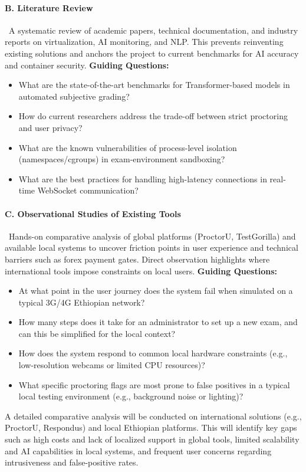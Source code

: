 \paragraph*{B. Literature Review}\
A systematic review of academic papers, technical documentation, and industry reports on virtualization, AI monitoring, and NLP. This prevents reinventing existing solutions and anchors the project to current benchmarks for AI accuracy and container security.
\textbf{Guiding Questions:}
\begin{itemize}
    \item What are the state-of-the-art benchmarks for Transformer-based models in automated subjective grading?
    \item How do current researchers address the trade-off between strict proctoring and user privacy?
    \item What are the known vulnerabilities of process-level isolation (namespaces/cgroups) in exam-environment sandboxing?
    \item What are the best practices for handling high-latency connections in real-time WebSocket communication?
\end{itemize}

\paragraph*{C. Observational Studies of Existing Tools}\
Hands-on comparative analysis of global platforms (ProctorU, TestGorilla) and available local systems to uncover friction points in user experience and technical barriers such as forex payment gates. Direct observation highlights where international tools impose constraints on local users.
\textbf{Guiding Questions:}
\begin{itemize}
    \item At what point in the user journey does the system fail when simulated on a typical 3G/4G Ethiopian network?
    \item How many steps does it take for an administrator to set up a new exam, and can this be simplified for the local context?
    \item How does the system respond to common local hardware constraints (e.g., low-resolution webcams or limited CPU resources)?
    \item What specific proctoring flags are most prone to false positives in a typical local testing environment (e.g., background noise or lighting)?
\end{itemize}
A detailed comparative analysis will be conducted on international solutions (e.g., ProctorU, Respondus) and local Ethiopian platforms. This will identify key gaps such as high costs and lack of localized support in global tools, limited scalability and AI capabilities in local systems, and frequent user concerns regarding intrusiveness and false-positive rates.


